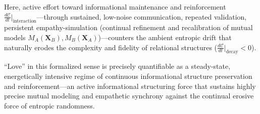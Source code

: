 Here, active effort toward informational maintenance and reinforcement $\frac{d\mathcal{C}}{dt}\Big\vert_{\text{interaction}}$---through sustained, low-noise communication, repeated validation, persistent empathy-simulation (continual refinement and recalibration of mutual models $M_A(\mathbf{X}_B), M_B(\mathbf{X}_A)$)---counters the ambient entropic drift that naturally erodes the complexity and fidelity of relational structures ($\frac{d\mathcal{C}}{dt}\Big\vert_{\text{decay}} < 0$).

``Love'' in this formalized sense is precisely quantifiable as a steady-state, energetically intensive regime of continuous informational structure preservation and reinforcement---an active informational structuring force that sustains highly precise mutual modeling and empathetic synchrony against the continual erosive force of entropic randomness.
